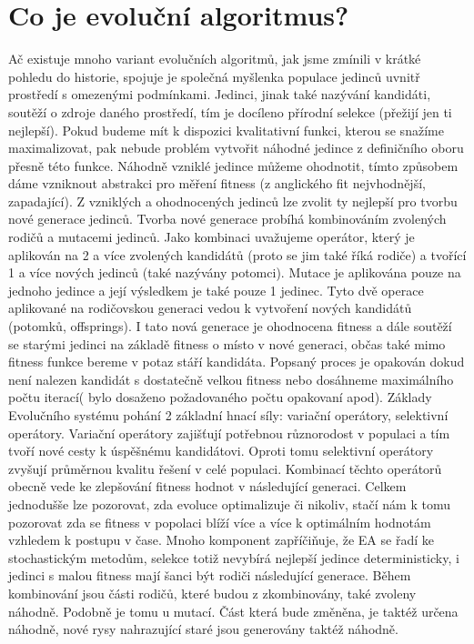 \section{Co je evoluční algoritmus?}
Ač existuje mnoho variant evolučních algoritmů, jak jsme zmínili v krátké pohledu do historie, spojuje je společná myšlenka populace jedinců uvnitř prostředí s omezenými podmínkami. Jedinci, jinak také nazývání kandidáti, soutěží o zdroje daného prostředí, tím je docíleno přírodní selekce (přežijí jen ti nejlepší). Pokud budeme mít k dispozici kvalitativní funkci, kterou se snažíme maximalizovat, pak nebude problém vytvořit náhodné jedince z definičního oboru přesně této funkce. Náhodně vzniklé jedince můžeme ohodnotit, tímto způsobem dáme vzniknout abstrakci pro měření fitness (z anglického fit nejvhodnější, zapadající). Z vzniklých a ohodnocených jedinců lze zvolit ty nejlepší pro tvorbu nové generace jedinců. Tvorba nové generace probíhá kombinováním zvolených rodičů a mutacemi jedinců. Jako kombinaci uvažujeme operátor, který je aplikován na 2 a více zvolených kandidátů (proto se jim také říká rodiče) a tvořící 1 a více nových jedinců (také nazývány potomci). Mutace je aplikována pouze na jednoho jedince a její výsledkem je také pouze 1 jedinec. Tyto dvě operace aplikované na rodičovskou generaci vedou k vytvoření nových kandidátů (potomků, offsprings). I tato nová generace je ohodnocena fitness a dále soutěží se starými jedinci na základě fitness o místo v nové generaci, občas také mimo fitness funkce bereme v potaz stáří kandidáta. Popsaný proces je opakován dokud není nalezen kandidát s dostatečně velkou fitness nebo dosáhneme maximálního počtu iterací( bylo dosaženo požadovaného počtu opakovaní apod). Základy Evolučního systému pohání 2 základní hnací síly: variační operátory, selektivní operátory. Variační operátory zajišťují potřebnou různorodost v populaci a tím tvoří nové cesty k úspěšnému kandidátovi. Oproti tomu selektivní operátory zvyšují průměrnou kvalitu řešení v celé populaci. Kombinací těchto operátorů obecně vede ke zlepšování fitness hodnot v následující generaci. Celkem jednodušše lze pozorovat, zda evoluce optimalizuje či nikoliv, stačí nám k tomu pozorovat zda se fitness v popolaci blíží více a více k optimálním hodnotám vzhledem k postupu v čase. Mnoho komponent zapříčiňuje, že EA se řadí ke stochastickým metodům, selekce totiž nevybírá nejlepší jedince deterministicky, i jedinci s malou fitness mají šanci být rodiči následující generace. Během kombinování jsou části rodičů, které budou z zkombinovány, také zvoleny náhodně. Podobně je tomu u mutací. Část která bude změněna, je taktéž určena náhodně, nové rysy nahrazující staré jsou generovány taktéž náhodně.  
